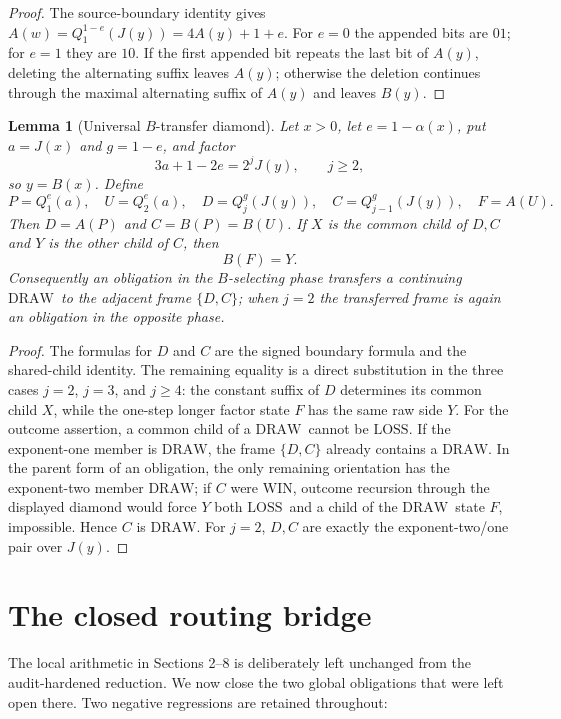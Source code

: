 \documentclass[11pt]{article}
\newtheorem{lemma}[theorem]{Lemma}
\newcommand{\WIN}{\ensuremath{\mathrm{WIN}}}
\newcommand{\LOSS}{\ensuremath{\mathrm{LOSS}}}
\newcommand{\DRAW}{\ensuremath{\mathrm{DRAW}}}
\begin{document}
\begin{proof}
The source-boundary identity gives
$A(w)=Q_1^{1-e}(J(y))=4A(y)+1+e$. For $e=0$ the appended bits are $01$;
for $e=1$ they are $10$. If the first appended bit repeats the last bit of
$A(y)$, deleting the alternating suffix leaves $A(y)$; otherwise the deletion
continues through the maximal alternating suffix of $A(y)$ and leaves
$B(y)$.
\end{proof}

\begin{lemma}[Universal $B$-transfer diamond]\label{lem:b-diamond}
Let $x>0$, let $e=1-\alpha(x)$, put $a=J(x)$ and $g=1-e$, and factor
\[
  3a+1-2e=2^jJ(y),\qquad j\ge2,
\]
so $y=B(x)$. Define
\[
 P=Q_1^e(a),\quad U=Q_2^e(a),\quad
 D=Q_j^g(J(y)),\quad C=Q_{j-1}^g(J(y)),\quad F=A(U).
\]
Then $D=A(P)$ and $C=B(P)=B(U)$. If $X$ is the common child of $D,C$ and
$Y$ is the other child of $C$, then
\[
  B(F)=Y.
\]
Consequently an obligation in the $B$-selecting phase transfers a continuing
\DRAW\ to the adjacent frame $\{D,C\}$; when $j=2$ the transferred frame is
again an obligation in the opposite phase.
\end{lemma}

\begin{proof}
The formulas for $D$ and $C$ are the signed boundary formula and the
shared-child identity. The remaining equality is a direct substitution in the
three cases $j=2$, $j=3$, and $j\ge4$: the constant suffix of $D$ determines
its common child $X$, while the one-step longer factor state $F$ has the same
raw side $Y$. For the outcome assertion, a common child of a \DRAW\ cannot be
\LOSS. If the exponent-one member is \DRAW, the frame $\{D,C\}$ already
contains a \DRAW. In the parent form of an obligation, the only remaining
orientation has the exponent-two member \DRAW; if $C$ were \WIN, outcome
recursion through the displayed diamond would force $Y$ both \LOSS\ and a
child of the \DRAW\ state $F$, impossible. Hence $C$ is \DRAW. For $j=2$,
$D,C$ are exactly the exponent-two/one pair over $J(y)$.
\end{proof}


\section{The closed routing bridge}\label{sec:closed-routing}

The local arithmetic in Sections 2--8 is deliberately left unchanged from the
audit-hardened reduction.  We now close the two global obligations that were
left open there.  Two negative regressions are retained throughout:
\end{document}
